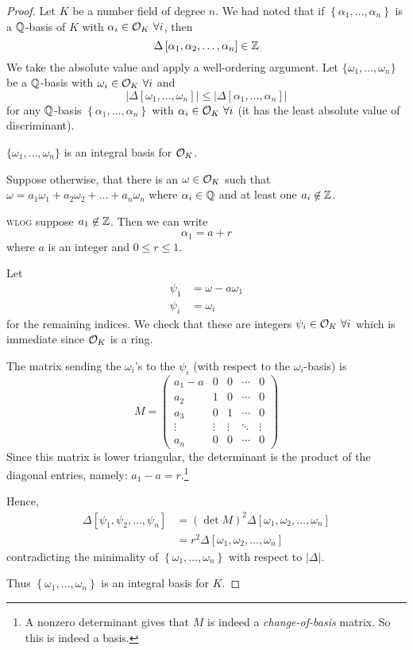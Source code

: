 \begin{proof}
    Let $K$ be a number field of degree $n$. We had noted that if $\left\{ \alpha_1, \dots, \alpha_n \right\}$ is a $\mathbb Q$-basis of $K$ with $\alpha_i\in \mathcal{O}_K\ \forall i$, then
    \[\Delta\left[ \alpha_1, \alpha_2, \dots, \alpha_n \right]\in\mathbb Z\]
    We take the absolute value and apply a well-ordering argument. Let $\{\omega_1, \dots, \omega_n\}$ be a $\mathbb Q$-basis with $\omega_i\in\mathcal{O}_K\ \forall i$ and
    \[|\Delta\left[ \omega_1, \dots, \omega_n \right]|\leq |\Delta\left[ \alpha_1, \dots, \alpha_n \right]|\]
    for any $\mathbb Q$-basis $\left\{ \alpha_1, \dots, \alpha_n \right\}$ with $\alpha_i\in \mathcal{O}_K\ \forall i$ (it has the least absolute value of discriminant).

    \begin{claim*}
        $\{\omega_1, \dots, \omega_n\}$ is an integral basis for $\mathcal{O}_K$.
    \end{claim*}
    Suppose otherwise, that there is an $\omega\in\mathcal{O}_K$ such that $\omega = a_1\omega_1 + a_2\omega_2 + \dots + a_n\omega_n$ where $\alpha_i\in\mathbb Q$ and at least one $a_i\not\in\mathbb Z$.

    \textsc{wlog} suppose $a_1\not\in\mathbb Z$. Then we can write
    \[\alpha_1 = a + r\]
    where $a$ is an integer and $0\leq r\leq 1$.

    Let
    \begin{align*}
        \psi_1 & = \omega - a\omega_1 \\
        \psi_i & = \omega_i
    \end{align*}
    for the remaining indices. We check that these are integers $\psi_i\in\mathcal{O}_K\ \forall i$ which is immediate since $\mathcal{O}_K$ is a ring.

    The matrix sending the $\omega_i$'s to the $\psi_i$ (with respect to the $\omega_i$-basis) is
    \[M = \begin{pmatrix}
            a_1 - a & 0      & 0      & \cdots & 0      \\
            a_2     & 1      & 0      & \cdots & 0      \\
            a_3     & 0      & 1      & \cdots & 0      \\
            \vdots  & \vdots & \vdots & \ddots & \vdots \\
            a_n     & 0      & 0      & \cdots & 0
        \end{pmatrix}\]
    Since this matrix is lower triangular, the determinant is the product of the diagonal entries, namely: $a_1 - a = r$.\footnote{A nonzero determinant gives that $M$ is indeed a \emph{change-of-basis} matrix. So this is indeed a basis.}

    Hence,
    \begin{align*}
        \Delta[\psi_1, \psi_2, \dots, \psi_n] & = (\det M)^2\Delta[\omega_1, \omega_2, \dots, \omega_n] \\
                                              & = r^2\Delta[\omega_1, \omega_2, \dots, \omega_n]
    \end{align*}
    contradicting the minimality of $\left\{ \omega_1, \dots, \omega_n \right\}$ with respect to $|\Delta|$.

    Thus $\left\{ \omega_1, \dots, \omega_n \right\}$ is an integral basis for $K$.
\end{proof}
